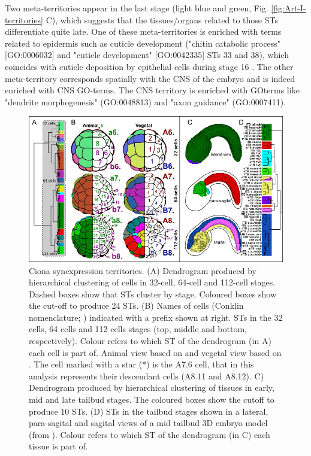 Two meta-territories appear in the last stage (light blue and green, Fig. \ref{fig:Art-I-territories} C), which suggests that the tissues/organs related to those STs differentiate quite late.
%
One of these meta-territories is enriched with terms related to epidermis such as cuticle development ("chitin catabolic process" [GO:0006032] and "cuticle development" [GO:0042335] STs 33 and 38), which coincides with cuticle deposition by epithelial cells during stage 16 \citep{Ostrowski2002}.
%
The other meta-territory corresponds spatially with the CNS of the embryo and is indeed enriched with CNS GO-terms.
The CNS territory is enriched with GOterms like "dendrite morphogenesis" (GO:0048813) and "axon guidance" (GO:0007411). 

\begin{figure}[ht]
  \includegraphics[width=\textwidth]{./Images/Art-II/territories.png}
  \centering
  \caption{Ciona synexpression territories. 
  (A) Dendrogram produced by hierarchical clustering of cells in 32-cell, 64-cell and 112-cell stages. Dashed boxes show that STs cluster by stage. Coloured boxes show the cut-off to produce 24 STs.
  (B) Names of cells (Conklin nomenclature; \citealp{Conklin1905}) indicated with a prefix shown at right. STs in the 32 cells, 64 cells and 112 cells stages (top, middle and bottom, respectively). Colour refers to which ST of the dendrogram (in A) each cell is part of. Animal view based on \citet{Nicol1988} and vegetal view based on \citet{Cole2004a}. The cell marked with a star (*) is the A7.6 cell, that in this analysis represents their descendant cells (A8.11 and A8.12).
  C) Dendrogram produced by hierarchical clustering of tissues in early, mid and late tailbud stages. The coloured boxes show the cutoff to produce 10 STs. (D) STs in the tailbud stages shown in a lateral, para-sagital and sagital views of a mid tailbud 3D embryo model (from \citealp{Nakamura2012}). Colour refers to which ST of the dendrogram (in C) each tissue is part of.
}
  \label{fig:Art-II-territories}
\end{figure}

